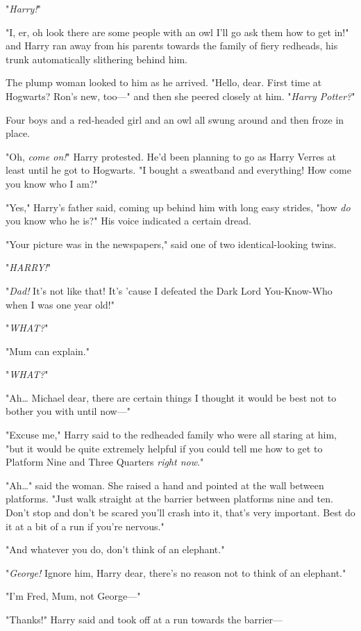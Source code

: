 "\emph{Harry!}"

"I, er, oh look there are some people with an owl I'll go ask them how to get
in!" and Harry ran away from his parents towards the family of fiery redheads,
his trunk automatically slithering behind him.

The plump woman looked to him as he arrived. "Hello, dear. First time at
Hogwarts? Ron's new, too---" and then she peered closely at him. "\emph{Harry
Potter?}"

Four boys and a red-headed girl and an owl all swung around and then froze in
place.

"Oh, \emph{come on!}" Harry protested. He'd been planning to go as Harry Verres
at least until he got to Hogwarts. "I bought a sweatband and everything! How
come you know who I am?"

"Yes," Harry's father said, coming up behind him with long easy strides, "how
\emph{do} you know who he is?" His voice indicated a certain dread.

"Your picture was in the newspapers," said one of two identical-looking twins.

"\emph{HARRY!}"

"\emph{Dad!} It's not like that! It's 'cause I defeated the Dark Lord
You-Know-Who when I was one year old!"

"\emph{WHAT?}"

"Mum can explain."

"\emph{WHAT?}"

"Ah{\ldots} Michael dear, there are certain things I thought it would be best
not to bother you with until now---"

"Excuse me," Harry said to the redheaded family who were all staring at him,
"but it would be quite extremely helpful if you could tell me how to get to
Platform Nine and Three Quarters \emph{right now}."

"Ah{\ldots}" said the woman. She raised a hand and pointed at the wall between
platforms. "Just walk straight at the barrier between platforms nine and ten.
Don't stop and don't be scared you'll crash into it, that's very important.
Best do it at a bit of a run if you're nervous."

"And whatever you do, don't think of an elephant."

"\emph{George!} Ignore him, Harry dear, there's no reason not to think of an
elephant."

"I'm Fred, Mum, not George---"

"Thanks!" Harry said and took off at a run towards the barrier---

